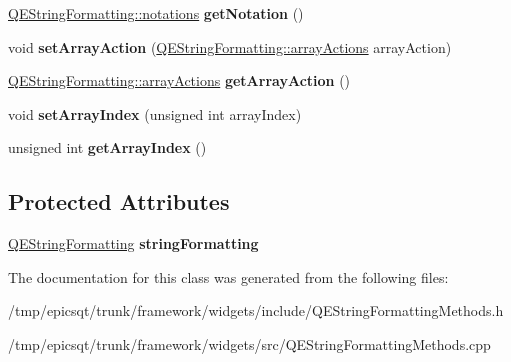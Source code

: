 \begin{DoxyCompactItemize}
\item 
\hypertarget{classQEStringFormattingMethods_a8745957614f6782a43b5d73a9fbb0927}{
\hyperlink{classQEStringFormatting_adfa7fa261e196d1327d4da6e046dbd84}{QEStringFormatting::notations} {\bfseries getNotation} ()}
\label{classQEStringFormattingMethods_a8745957614f6782a43b5d73a9fbb0927}

\item 
\hypertarget{classQEStringFormattingMethods_a37add8b1fa5e3429d2ff7a2e3bb75337}{
void {\bfseries setArrayAction} (\hyperlink{classQEStringFormatting_a36b424886bc64cea8f7ed69b2b03c0b9}{QEStringFormatting::arrayActions} arrayAction)}
\label{classQEStringFormattingMethods_a37add8b1fa5e3429d2ff7a2e3bb75337}

\item 
\hypertarget{classQEStringFormattingMethods_a1139fc33b4075b156174bb6b1fc18a45}{
\hyperlink{classQEStringFormatting_a36b424886bc64cea8f7ed69b2b03c0b9}{QEStringFormatting::arrayActions} {\bfseries getArrayAction} ()}
\label{classQEStringFormattingMethods_a1139fc33b4075b156174bb6b1fc18a45}

\item 
\hypertarget{classQEStringFormattingMethods_aa2f7ab48920b3d6b2b04bd688d3402e4}{
void {\bfseries setArrayIndex} (unsigned int arrayIndex)}
\label{classQEStringFormattingMethods_aa2f7ab48920b3d6b2b04bd688d3402e4}

\item 
\hypertarget{classQEStringFormattingMethods_a7a26f542c4773ac50bc2c4e42d5f65ca}{
unsigned int {\bfseries getArrayIndex} ()}
\label{classQEStringFormattingMethods_a7a26f542c4773ac50bc2c4e42d5f65ca}

\end{DoxyCompactItemize}
\subsection*{Protected Attributes}
\begin{DoxyCompactItemize}
\item 
\hypertarget{classQEStringFormattingMethods_aa9000da3576d084bc7b12a2ca7534521}{
\hyperlink{classQEStringFormatting}{QEStringFormatting} {\bfseries stringFormatting}}
\label{classQEStringFormattingMethods_aa9000da3576d084bc7b12a2ca7534521}

\end{DoxyCompactItemize}


The documentation for this class was generated from the following files:\begin{DoxyCompactItemize}
\item 
/tmp/epicsqt/trunk/framework/widgets/include/QEStringFormattingMethods.h\item 
/tmp/epicsqt/trunk/framework/widgets/src/QEStringFormattingMethods.cpp\end{DoxyCompactItemize}
